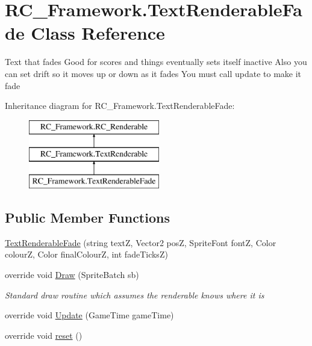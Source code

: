 \hypertarget{class_r_c___framework_1_1_text_renderable_fade}{}\section{R\+C\+\_\+\+Framework.\+Text\+Renderable\+Fade Class Reference}
\label{class_r_c___framework_1_1_text_renderable_fade}


Text that fades Good for scores and things eventually sets itself inactive Also you can set drift so it moves up or down as it fades You must call update to make it fade  


Inheritance diagram for R\+C\+\_\+\+Framework.\+Text\+Renderable\+Fade\+:\begin{figure}[H]
\begin{center}
\leavevmode
\includegraphics[height=3.000000cm]{class_r_c___framework_1_1_text_renderable_fade}
\end{center}
\end{figure}
\subsection*{Public Member Functions}
\begin{DoxyCompactItemize}
\item 
\mbox{\hyperlink{class_r_c___framework_1_1_text_renderable_fade_afb0c50102dc8e9ca366459d671e34f69}{Text\+Renderable\+Fade}} (string textZ, Vector2 posZ, Sprite\+Font fontZ, Color colourZ, Color final\+ColourZ, int fade\+TicksZ)
\item 
override void \mbox{\hyperlink{class_r_c___framework_1_1_text_renderable_fade_a6c0562ac01be810eb4e81f3f81e21bbd}{Draw}} (Sprite\+Batch sb)
\begin{DoxyCompactList}\small\item\em Standard draw routine which assumes the renderable knows where it is \end{DoxyCompactList}\item 
override void \mbox{\hyperlink{class_r_c___framework_1_1_text_renderable_fade_acbfdaa774ae0bc55e6c5593b765c9c38}{Update}} (Game\+Time game\+Time)
\item 
override void \mbox{\hyperlink{class_r_c___framework_1_1_text_renderable_fade_ab37a0a521d74ac2b706023c5a0fc73ab}{reset}} ()
\end{DoxyCompactItemize}
